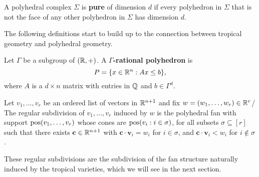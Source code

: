 	\begin{definition}[Pure]
		A polyhedral complex $\Sigma$ is \textbf{pure} 
		of dimension $d$ if every polyhedron in $\Sigma$ 
		that is not the face of any other polyhedron in $\Sigma$ 
		has dimension $d$. 
	\end{definition}
	
	The following definitions start to build up to 
	the connection between 
	tropical geometry and polyhedral geometry.
	
	\begin{definition}
		Let $\Gamma$ be a subgroup of $(\mathbb{R}, +)$.
		A \textbf{$\Gamma$-rational polyhedron} 
		is 
		\[
		P = \{x \in \mathbb{R}^n: Ax \le b\},
		\]
		where $A$ is a $d \times n$ matrix with entries in $\mathbb{Q}$
		and $b \in \Gamma^d$. 
	\end{definition}
	
	\begin{definition}
		Let $v_1, \ldots, v_r$ be an ordered list of vectors 
		in $\mathbb{R}^{n+1}$ 
		and fix $w = (w_1, \ldots, w_r) \in \mathbb{R}^r$/
		The regular subdivision of $v_1, \ldots, v_r$ induced 
		by $w$ is the polyhedral fan with support
		$\operatorname{pos}(v_1, \ldots, v_r)$
		whose cones are $\operatorname{pos}(v_i: i \in \sigma)$,
		for all subsets $\sigma \subseteq [r]$
		such that there exists $\mathbf{c} \in \mathbb{R}^{n+1}$ 
		with $\mathbf{c} \cdot \mathbf{v}_i = w_i$ for $i \in \sigma$,
		and 
		$\mathbf{c} \cdot \mathbf{v}_i < w_i$ for $i \notin \sigma$.
	\end{definition}
	These regular subdivisions are the subdivision of the fan structure naturally induced by the tropical varieties, which we will see in the next section. 
	
	